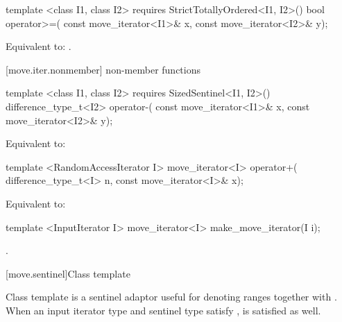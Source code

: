 %
%
\begin{itemdecl}
template <class I1, class I2>
    requires StrictTotallyOrdered<I1, I2>()
  bool operator>=(
    const move_iterator<I1>& x, const move_iterator<I2>& y);
\end{itemdecl}

\begin{itemdescr}
\pnum
\effects Equivalent to:
.
\end{itemdescr}

[move.iter.nonmember]{ non-member functions}

%
%
\begin{itemdecl}
template <class I1, class I2>
    requires SizedSentinel<I1, I2>()
  difference_type_t<I2> operator-(
    const move_iterator<I1>& x,
    const move_iterator<I2>& y);
\end{itemdecl}

\begin{itemdescr}
\pnum
\effects Equivalent to:
\end{itemdescr}

%
%
\begin{itemdecl}
template <RandomAccessIterator I>
  move_iterator<I>
    operator+(
      difference_type_t<I> n,
      const move_iterator<I>& x);
\end{itemdecl}

\begin{itemdescr}
\pnum
\effects Equivalent to:
\end{itemdescr}

%
\begin{itemdecl}
template <InputIterator I>
  move_iterator<I> make_move_iterator(I i);
\end{itemdecl}

\begin{itemdescr}
\pnum
\returns {}.
\end{itemdescr}

[move.sentinel]{Class template }

\pnum
Class template  is a sentinel adaptor useful for denoting
ranges together with . When an input iterator type
 and sentinel type  satisfy ,
 is satisfied as well.

